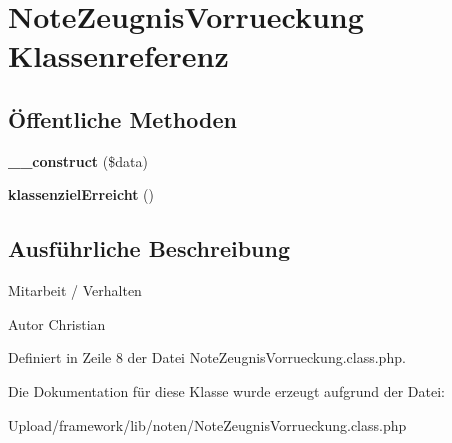 \hypertarget{class_note_zeugnis_vorrueckung}{}\section{Note\+Zeugnis\+Vorrueckung Klassenreferenz}
\label{class_note_zeugnis_vorrueckung}
\subsection*{Öffentliche Methoden}
\begin{DoxyCompactItemize}
\item 
\mbox{\label{class_note_zeugnis_vorrueckung_a4f9c5364bec971fb753f779abcee349e}} 
{\bfseries \+\_\+\+\_\+construct} (\$data)
\item 
\mbox{\label{class_note_zeugnis_vorrueckung_a0228178c2783131a5a1cc7f5cda943de}} 
{\bfseries klassenziel\+Erreicht} ()
\end{DoxyCompactItemize}


\subsection{Ausführliche Beschreibung}
Mitarbeit / Verhalten \begin{DoxyAuthor}{Autor}
Christian 
\end{DoxyAuthor}


Definiert in Zeile 8 der Datei Note\+Zeugnis\+Vorrueckung.\+class.\+php.



Die Dokumentation für diese Klasse wurde erzeugt aufgrund der Datei\+:\begin{DoxyCompactItemize}
\item 
Upload/framework/lib/noten/Note\+Zeugnis\+Vorrueckung.\+class.\+php\end{DoxyCompactItemize}
